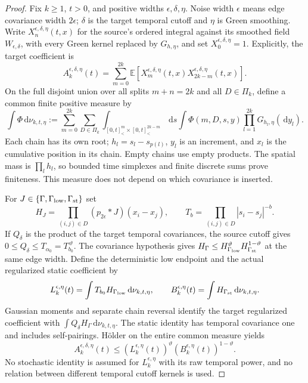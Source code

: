 \documentclass[12pt]{article}
\numberwithin{equation}{section}
\theoremstyle{definition}
\newcommand{\E}{\mathbb{E}}
\newcommand{\ud}{\,\mathrm{d}}
\begin{document}
\begin{proof}
  Fix $k\ge1$, $t>0$, and positive widths $\epsilon,\delta,\eta$.
  Noise width $\epsilon$ means edge covariance width $2\epsilon$;
  $\delta$ is the target temporal cutoff and $\eta$ is Green smoothing.
  Write $X_n^{\epsilon,\delta,\eta}(t,x)$ for the source's ordered
  integral against its smoothed field $W_{\epsilon,\delta}$, with
  every Green kernel replaced by $G_{h,\eta}$, and set
  $X_0^{\epsilon,\delta,\eta}=1$. Explicitly, the target coefficient is
  \[
    A_k^{\epsilon,\delta,\eta}(t)
    =\sum_{m=0}^{2k}
    \E\left[X_m^{\epsilon,\delta,\eta}(t,x)
    X_{2k-m}^{\epsilon,\delta,\eta}(t,x)\right].
  \]
  On the full disjoint union over all splits $m+n=2k$ and all
  $D\in\Pi_k$, define a common finite positive measure by
  \[
    \int\Phi\ud\nu_{k,t,\eta}
    :=\sum_{m=0}^{2k}\sum_{D\in\Pi_k}
    \int_{[0,t]^m_<\times[0,t]^{2k-m}_<}\ud s
    \int\Phi(m,D,s,y)\prod_{l=1}^{2k}G_{h_l,\eta}(\ud y_l).
  \]
  Each chain has its own root; $h_l=s_l-s_{p(l)}$, $y_l$ is an
  increment, and $x_l$ is the cumulative position in its chain.
  Empty chains use empty products. The spatial mass is $\prod_lh_l$,
  so bounded time simplexes and finite discrete sums prove finiteness.
  This measure does not depend on which covariance is inserted.

  For $J\in\{\Gamma,\Gamma_{\rm low},\Gamma_{\rm st}\}$ set
  \[
    H_J=\prod_{(i,j)\in D}(p_{2\epsilon}*J)(x_i-x_j),\qquad
    T_b=\prod_{(i,j)\in D}|s_i-s_j|^{-b}.
  \]
  If $Q_\delta$ is the product of the target temporal covariances,
  the source cutoff gives $0\le Q_\delta\le T_{\alpha_0}
  =T_{b_0}^{\,\vartheta}$. The covariance hypothesis gives
  $H_\Gamma\le H_{\Gamma_{\rm low}}^\vartheta
  H_{\Gamma_{\rm st}}^{1-\vartheta}$ at the same edge width.
  Define the deterministic low endpoint and the actual regularized
  static coefficient by
  \[
    L_k^{\epsilon,\eta}(t)
    =\int T_{b_0}H_{\Gamma_{\rm low}}\ud\nu_{k,t,\eta},
    \qquad
    B_k^{\epsilon,\eta}(t)
    =\int H_{\Gamma_{\rm st}}\ud\nu_{k,t,\eta}.
  \]
  Gaussian moments and separate chain reversal identify the target
  regularized coefficient with $\int Q_\delta H_\Gamma
  \ud\nu_{k,t,\eta}$. The static identity has temporal covariance
  one and includes self-pairings. H\"older on the entire common measure
  yields
  \begin{equation}\label{E:three-regularized-holder}
    A_k^{\epsilon,\delta,\eta}(t)
    \le\left(L_k^{\epsilon,\eta}(t)\right)^\vartheta
    \left(B_k^{\epsilon,\eta}(t)\right)^{1-\vartheta}.
  \end{equation}
  No stochastic identity is assumed for $L_k^{\epsilon,\eta}$ with
  its raw temporal power, and no relation between different temporal
  cutoff kernels is used.


\end{proof}
\end{document}
